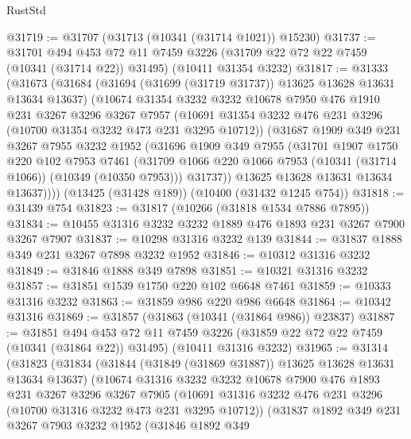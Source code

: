 \begin{lexlean}{RustStd}
\begin{coremodule}
@31719 := @31707 (@31713 (@10341 (@31714 @1021)) @15230)
@31737 := @31701
    @494
    @453
    @72
    @11
    @7459
    @3226
    (@31709 @22 @72 @22 @7459 (@10341 (@31714 @22)) @31495)
    (@10411 @31354 @3232)
@31817 := @31333
    (@31673
      (@31684
        (@31694 (@31699 (@31719 @31737)) @13625 @13628 @13631 @13634 @13637)
        (@10674
          @31354
          @3232
          @3232
          @10678
          @7950
          @476
          @1910
          @231
          @3267
          @3296
          @3267
          @7957
          (@10691 @31354 @3232 @476 @231 @3296 (@10700 @31354 @3232 @473 @231 @3295 @10712))
          (@31687
            @1909
            @349
            @231
            @3267
            @7955
            @3232
            @1952
            (@31696
              @1909
              @349
              @7955
              (@31701
                @1907
                @1750
                @220
                @102
                @7953
                @7461
                (@31709 @1066 @220 @1066 @7953 (@10341 (@31714 @1066)) (@10349 (@10350 @7953)))
                @31737))
            @13625
            @13628
            @13631
            @13634
            @13637))))
    (@13425 (@31428 @189))
    (@10400 (@31432 @1245 @754))
@31818 := @31439 @754
@31823 := @31817 (@10266 (@31818 @1534 @7886 @7895))
@31834 := @10455 @31316 @3232 @3232 @1889 @476 @1893 @231 @3267 @7900 @3267 @7907
@31837 := @10298 @31316 @3232 @139
@31844 := @31837 @1888 @349 @231 @3267 @7898 @3232 @1952
@31846 := @10312 @31316 @3232
@31849 := @31846 @1888 @349 @7898
@31851 := @10321 @31316 @3232
@31857 := @31851 @1539 @1750 @220 @102 @6648 @7461
@31859 := @10333 @31316 @3232
@31863 := @31859 @986 @220 @986 @6648
@31864 := @10342 @31316
@31869 := @31857 (@31863 (@10341 (@31864 @986)) @23837)
@31887 := @31851
    @494
    @453
    @72
    @11
    @7459
    @3226
    (@31859 @22 @72 @22 @7459 (@10341 (@31864 @22)) @31495)
    (@10411 @31316 @3232)
@31965 := @31314
    (@31823
      (@31834
        (@31844 (@31849 (@31869 @31887)) @13625 @13628 @13631 @13634 @13637)
        (@10674
          @31316
          @3232
          @3232
          @10678
          @7900
          @476
          @1893
          @231
          @3267
          @3296
          @3267
          @7905
          (@10691 @31316 @3232 @476 @231 @3296 (@10700 @31316 @3232 @473 @231 @3295 @10712))
          (@31837
            @1892
            @349
            @231
            @3267
            @7903
            @3232
            @1952
            (@31846
              @1892
              @349

\end{coremodule}
\end{lexlean}
